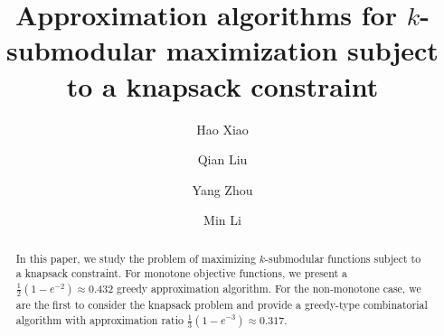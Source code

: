\documentclass[preprint,12pt]{elsarticle}
\begin{document}
\begin{frontmatter}



\title{Approximation algorithms for $k$-submodular maximization subject to a knapsack constraint}

\author[1]{Hao Xiao}
\author[1]{Qian Liu}
\author[1]{Yang Zhou}
\author[1]{Min Li}




\address[1]{School of Mathematics and Statistics, Shandong Normal University, P.R. China.}


\begin{abstract}
In this paper, we study the problem of maximizing $k$-submodular functions subject to a knapsack constraint.
For monotone objective functions, we present a $\frac{1}{2}(1-e^{-2})\approx 0.432$ greedy approximation algorithm.
For the non-monotone case, we are the first to consider the knapsack problem and provide a greedy-type combinatorial algorithm with approximation ratio $\frac{1}{3}(1-e^{-3})\approx 0.317$.
\end{abstract}






\end{frontmatter}
\end{document}
